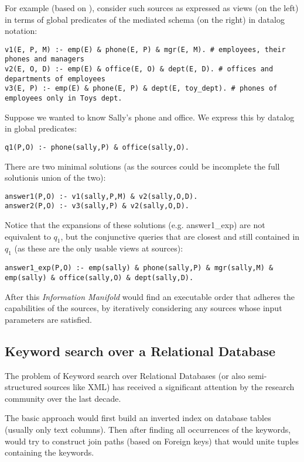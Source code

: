For example (based on \cite{integr_views2000}), consider such sources as expressed as views (on the left) in terms of global predicates of the mediated schema (on the right) in datalog notation:
%
{\small
\begin{verbatim}
v1(E, P, M) :- emp(E) & phone(E, P) & mgr(E, M). # employees, their phones and managers
v2(E, O, D) :- emp(E) & office(E, O) & dept(E, D). # offices and departments of employees
v3(E, P) :- emp(E) & phone(E, P) & dept(E, toy_dept). # phones of employees only in Toys dept.
\end{verbatim}
}
%
Suppose we wanted to know Sally's phone and office. We express this by datalog in global predicates:
{\small\begin{verbatim}
q1(P,O) :- phone(sally,P) & office(sally,O).
\end{verbatim}}
There are two minimal solutions (as the sources could be incomplete the full solutionis union of the two):
{\small
\begin{verbatim}
answer1(P,O) :- v1(sally,P,M) & v2(sally,O,D).
answer2(P,O) :- v3(sally,P) & v2(sally,O,D).
\end{verbatim}}
Notice that the expansions of these solutions (e.g. answer1\_exp) are not equivalent to $q_1$, but the conjunctive queries that are closest and still contained in $q_1$ (as these are the only usable views at sources):
{\footnotesize\begin{verbatim}
answer1_exp(P,O) :- emp(sally) & phone(sally,P) & mgr(sally,M) & emp(sally) & office(sally,O) & dept(sally,D).
\end{verbatim}
}
After this \textit{Information Manifold} would find an executable order that adheres the capabilities of the sources, by iteratively considering any sources whose input parameters are satisfied. 


\subsection{Keyword search over a Relational Database}
The problem of Keyword search over Relational Databases (or also semi-structured sources like XML) has received a significant attention by the research community over the last decade. 

The basic approach would first build an inverted index on database tables (usually only text columns). Then after finding all occurrences of the keywords, would try to construct join paths (based on Foreign keys) that would unite tuples containing the keywords.

